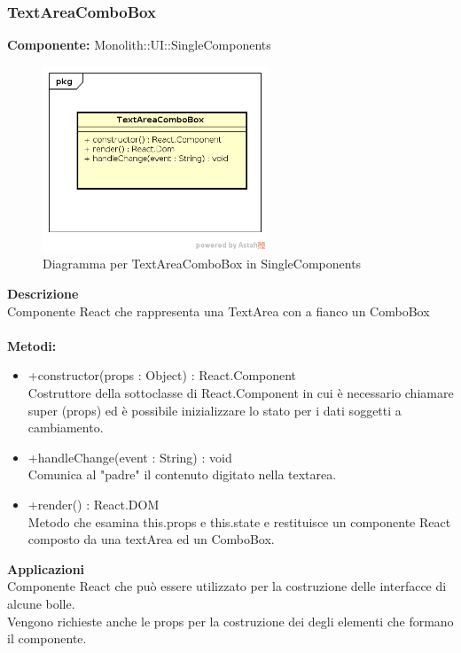 \clearpage

\subsubsection{TextAreaComboBox}
\textbf{Componente:}  Monolith::UI::SingleComponents\\
   \FloatBarrier
   \begin{figure}[ht]
   \centering
   \includegraphics[width=0.6\textwidth]{img/single-TextAreaComboBox.png}
   \caption{{Diagramma per TextAreaComboBox in SingleComponents}}
\end{figure}
\FloatBarrier
\textbf{Descrizione}\\
Componente React che rappresenta una TextArea con a fianco un ComboBox \\\\
\textbf{Metodi:} 
\begin{itemize}

\item +constructor(props : Object) : React.Component 
\\
Costruttore della sottoclasse di React.Component in cui è necessario chiamare super (props) ed è possibile inizializzare lo stato per i dati soggetti a cambiamento.

\item +handleChange(event : String) : void  
\\ 
Comunica al "padre" il contenuto digitato nella textarea.

\item +render() : React.DOM 
\\
Metodo che esamina this.props e this.state e restituisce un componente React composto da una textArea ed un ComboBox.

\end{itemize} 


\textbf{Applicazioni}\\
Componente React che può essere utilizzato per la costruzione delle interfacce di alcune bolle.
\\ Vengono richieste anche le props per la costruzione dei degli elementi che formano il componente. 



